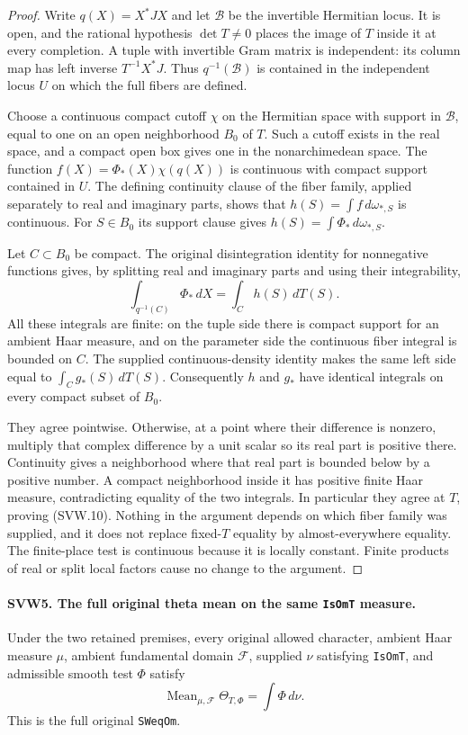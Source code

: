 \documentclass[11pt,a4paper]{article}
\numberwithin{equation}{section}
\theoremstyle{remark}\newtheorem{remark}[theorem]{Remark}
\begin{document}
\begin{proof}
Write $q(X)=X^*JX$ and let $\mathcal B$ be the invertible Hermitian
locus.  It is open, and the rational hypothesis $\det T\ne0$
places the image of $T$ inside it at every completion.  A tuple
with invertible Gram matrix is independent: its column map has
left inverse $T^{-1}X^*J$.  Thus $q^{-1}(\mathcal B)$ is contained
in the independent locus $U$ on which the full fibers are defined.

Choose a continuous compact cutoff $\chi$ on the Hermitian space
with support in $\mathcal B$, equal to one on an open neighborhood
$B_0$ of $T$.  Such a cutoff exists in the real space, and a compact
open box gives one in the nonarchimedean space.  The function
$f(X)=\Phi_*(X)\chi(q(X))$ is continuous with compact support
contained in $U$.  The defining continuity clause of the fiber
family, applied separately to real and imaginary parts, shows that
$h(S)=\int f\,d\omega_{*,S}$ is continuous.  For $S\in B_0$ its
support clause gives $h(S)=\int\Phi_*\,d\omega_{*,S}$.

Let $C\subset B_0$ be compact.  The original disintegration identity
for nonnegative functions gives, by splitting real and imaginary
parts and using their integrability,
\[
 \int_{q^{-1}(C)}\Phi_*\,dX
     =\int_C h(S)\,dT(S).
 \tag{SVW.11}
\]
All these integrals are finite: on the tuple side there is compact
support for an ambient Haar measure, and on the parameter side the
continuous fiber integral is bounded on $C$.  The supplied
continuous-density identity makes the same left side equal to
$\int_C g_*(S)\,dT(S)$.  Consequently $h$ and $g_*$ have identical
integrals on every compact subset of $B_0$.

They agree pointwise.  Otherwise, at a point where their difference
is nonzero, multiply that complex difference by a unit scalar so
its real part is positive there.  Continuity gives a neighborhood
where that real part is bounded below by a positive number.  A
compact neighborhood inside it has positive finite Haar measure,
contradicting equality of the two integrals.  In particular they
agree at $T$, proving (SVW.10).  Nothing in the argument depends on
which fiber family was supplied, and it does not replace fixed-$T$
equality by almost-everywhere equality.  The finite-place test is
continuous because it is locally constant.  Finite products of
real or split local factors cause no change to the argument.
\end{proof}

\paragraph{SVW5. The full original theta mean on the same \texttt{Is\allowbreak Om\allowbreak T} measure.}
\label{claim:SVW5}
Under the two retained premises, every original allowed character,
ambient Haar measure $\mu$, ambient fundamental domain $\mathcal F$,
supplied $\nu$ satisfying \texttt{Is\allowbreak Om\allowbreak T}, and admissible smooth test
$\Phi$ satisfy
\[
           \operatorname{Mean}_{\mu,\mathcal F}\Theta_{T,\Phi}
                          =\int\Phi\,d\nu.
 \tag{SVW.12}
\]
This is the full original \texttt{SWeq\allowbreak Om}.
\end{document}
